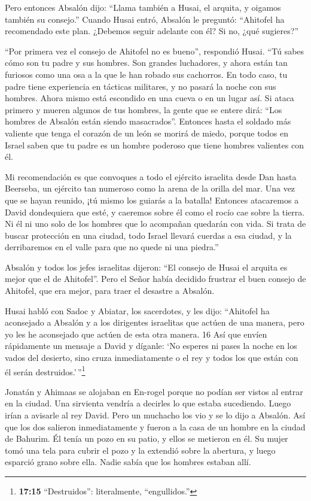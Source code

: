  Pero entonces Absalón dijo: ``Llama también a Husai, el
arquita, y oigamos también su consejo.''  Cuando Husai
entró, Absalón le preguntó: ``Ahitofel ha recomendado este plan.
¿Debemos seguir adelante con él? Si no, ¿qué sugieres?''

 ``Por primera vez el consejo de Ahitofel no es bueno'',
respondió Husai.  ``Tú sabes cómo son tu padre y sus
hombres. Son grandes luchadores, y ahora están tan furiosos como una osa
a la que le han robado sus cachorros. En todo caso, tu padre tiene
experiencia en tácticas militares, y no pasará la noche con sus hombres.
 Ahora mismo está escondido en una cueva o en un lugar así.
Si ataca primero y mueren algunos de tus hombres, la gente que se entere
dirá: ``Los hombres de Absalón están siendo masacrados''. 
Entonces hasta el soldado más valiente que tenga el corazón de un león
se morirá de miedo, porque todos en Israel saben que tu padre es un
hombre poderoso que tiene hombres valientes con él.

 Mi recomendación es que convoques a todo el ejército
israelita desde Dan hasta Beerseba, un ejército tan numeroso como la
arena de la orilla del mar. Una vez que se hayan reunido, ¡tú mismo los
guiarás a la batalla!  Entonces atacaremos a David
dondequiera que esté, y caeremos sobre él como el rocío cae sobre la
tierra. Ni él ni uno solo de los hombres que lo acompañan quedarán con
vida.  Si trata de buscar protección en una ciudad, todo
Israel llevará cuerdas a esa ciudad, y la derribaremos en el valle para
que no quede ni una piedra.''

 Absalón y todos los jefes israelitas dijeron: ``El consejo
de Husai el arquita es mejor que el de Ahitofel''. Pero el Señor había
decidido frustrar el buen consejo de Ahitofel, que era mejor, para traer
el desastre a Absalón.

 Husai habló con Sadoc y Abiatar, los sacerdotes, y les
dijo: ``Ahitofel ha aconsejado a Absalón y a los dirigentes israelitas
que actúen de una manera, pero yo les he aconsejado que actúen de esta
otra manera. 16 Así que envíen rápidamente un mensaje a David y díganle:
`No esperes ni pases la noche en los vados del desierto, sino cruza
inmediatamente o el rey y todos los que están con él serán
destruidos.'\,''\footnote{\textbf{17:15} ``Destruidos'': literalmente,
  ``engullidos.''}

 Jonatán y Ahimaas se alojaban en En-rogel porque no podían
ser vistos al entrar en la ciudad. Una sirvienta vendría a decirles lo
que estaba sucediendo. Luego irían a avisarle al rey David.
 Pero un muchacho los vio y se lo dijo a Absalón. Así que
los dos salieron inmediatamente y fueron a la casa de un hombre en la
ciudad de Bahurim. Él tenía un pozo en su patio, y ellos se metieron en
él.  Su mujer tomó una tela para cubrir el pozo y la
extendió sobre la abertura, y luego esparció grano sobre ella. Nadie
sabía que los hombres estaban allí.

